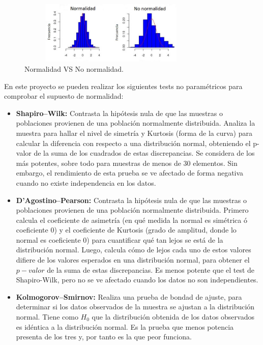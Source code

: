 \begin{figure}[h]
\centering
\includegraphics[width=9cm,height=3cm]{figuras/normalidad.jpg}
\caption{Normalidad VS No normalidad.}
\label{fig:normalidad}
\end{figure}

En este proyecto se pueden realizar los siguientes tests no paramétricos para comprobar el supuesto de normalidad:

\begin{itemize}
\item \textbf{Shapiro–Wilk:} Contrasta la hipótesis nula de que las muestras o poblaciones provienen de una
población normalmente distribuida. Analiza la muestra para hallar el nivel de simetría y Kurtosis (forma de
la curva) para calcular la diferencia con respecto a una distribución normal, obteniendo el p-valor de la suma
de los cuadrados de estas discrepancias. Se considera de los más potentes, sobre todo para muestras de menos
de 30 elementos. Sin embargo, el rendimiento de esta prueba se ve afectado de forma negativa cuando no existe
independencia en los datos.
\item \textbf{D’Agostino–Pearson:} Contrasta la hipótesis nula de que las muestras o poblaciones provienen de
una población normalmente distribuida. Primero calcula el coeficiente de asimetría (en qué medida la normal es
simétrica ó coeficiente 0) y el coeficiente de Kurtosis (grado de amplitud, donde lo normal es coeficiente 0) para
cuantificar qué tan lejos se está de la distribución normal. Luego, calcula cómo de lejos cada uno de estos valores
difiere de los valores esperados en una distribución normal, para obtener el $p-valor$ de la suma de estas
discrepancias. Es menos potente que el test de Shapiro-Wilk, pero no se ve afectado cuando los datos no son
independientes.
\item \textbf{Kolmogorov–Smirnov:} Realiza una prueba de bondad de ajuste, para determinar si los datos observados
de la muestra se ajustan a la distribución normal. Tiene como $H_0$ que la distribución obtenida de los datos
observados es idéntica a la distribución normal. Es la prueba que menos potencia presenta de los tres y, por tanto
es la que peor funciona.
\end{itemize}

